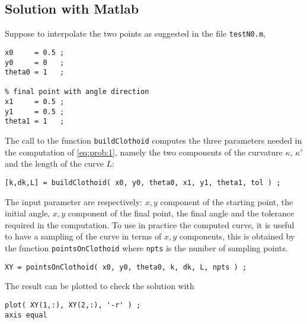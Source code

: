 \documentclass[preprint,3p]{elsarticle}
\begin{document}
\subsection{Solution with Matlab}
Suppose to interpolate the two points as suggested in the file \texttt{testN0.m},
\begin{lstlisting}[breaklines, backgroundcolor=\color{gray!10},basicstyle=\small\ttfamily]
% initial point with angle direction
x0     = 0.5 ;
y0     = 0   ;
theta0 = 1   ;

% final point with angle direction
x1     = 0.5 ;
y1     = 0.5 ;
theta1 = 1   ;
\end{lstlisting}
The call to the function \texttt{buildClothoid} computes the three parameters needed in the computation of \eqref{eq:prob:1}, namely the two components of the curvature $\kappa$, $\kappa'$ and the length of the curve $L$:
\begin{lstlisting}[breaklines, backgroundcolor=\color{gray!10},basicstyle=\small\ttfamily]
% compute clothoid parameters
[k,dk,L] = buildClothoid( x0, y0, theta0, x1, y1, theta1, tol ) ;
\end{lstlisting}
The input parameter are respectively: $x,y$ component of the starting point, the initial angle, $x,y$ component of the final point, the final angle and the tolerance required in the computation.
To use in practice the computed curve, it is useful to have a sampling of the curve in terms of $x,y$ components, this is obtained by the function \texttt{pointsOnClothoid} where \texttt{npts} is the number of sampling points.
\begin{lstlisting}[breaklines, backgroundcolor=\color{gray!10},basicstyle=\small\ttfamily]
% compute points on clothoid
XY = pointsOnClothoid( x0, y0, theta0, k, dk, L, npts ) ;
\end{lstlisting}
The result can be plotted to check the solution with
\begin{lstlisting}[breaklines, backgroundcolor=\color{gray!10},basicstyle=\small\ttfamily]
% plot solution
plot( XY(1,:), XY(2,:), '-r' ) ;
axis equal
\end{lstlisting}
\end{document}
